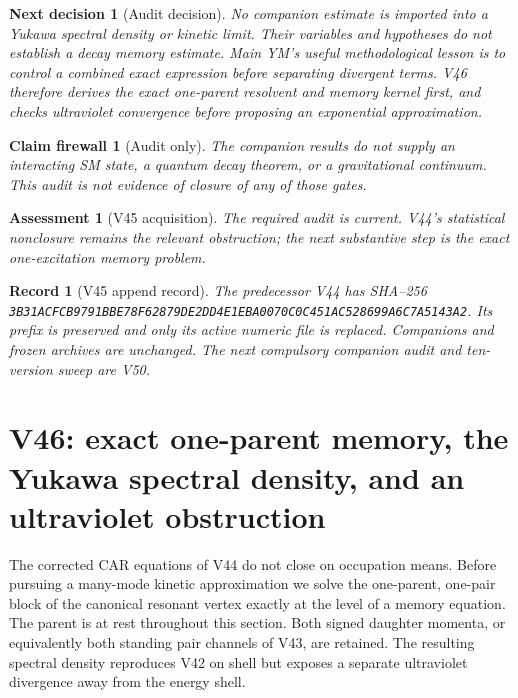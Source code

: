 \documentclass[11pt]{article}
\newtheorem{firewall}[theorem]{Claim firewall}
\newtheorem{decision}[theorem]{Next decision}
\newtheorem{assessment}[theorem]{Assessment}
\newtheorem{record}[theorem]{Record}
\theoremstyle{remark}
\begin{document}
\begin{decision}[Audit decision]
\label{dec:v20v45-audit}
No companion estimate is imported into a Yukawa spectral density or
kinetic limit.  Their variables and hypotheses do not establish a
decay memory estimate.  Main YM's useful methodological lesson is to
control a combined exact expression before separating divergent terms.
V46 therefore derives the exact one-parent resolvent and memory kernel
first, and checks ultraviolet convergence before proposing an
exponential approximation.
\end{decision}

\begin{firewall}[Audit only]
\label{fire:v20v45}
The companion results do not supply an interacting SM state, a
quantum decay theorem, or a gravitational continuum.  This audit is
not evidence of closure of any of those gates.
\end{firewall}

\begin{assessment}[V45 acquisition]
\label{ass:v20v45}
The required audit is current.  V44's statistical nonclosure remains
the relevant obstruction; the next substantive step is the exact
one-excitation memory problem.
\end{assessment}

\begin{record}[V45 append record]
\label{rec:v20v45}
The predecessor V44 has SHA--256
\texttt{3B31ACFCB9791BBE78F62879DE2DD4E1EBA0070C0C451AC528699A6C7A5143A2}.
Its prefix is preserved and only its active numeric file is replaced.
Companions and frozen archives are unchanged.  The next compulsory
companion audit and ten-version sweep are V50.
\end{record}



\section{V46: exact one-parent memory, the Yukawa spectral density, and an ultraviolet obstruction}
\label{sec:v20v46}

The corrected CAR equations of V44 do not close on occupation means.
Before pursuing a many-mode kinetic approximation we solve the
one-parent, one-pair block of the canonical resonant vertex exactly
at the level of a memory equation.  The parent is at rest throughout
this section.  Both signed daughter momenta, or equivalently both
standing pair channels of V43, are retained.  The resulting spectral
density reproduces V42 on shell but exposes a separate ultraviolet
divergence away from the energy shell.
\end{document}
